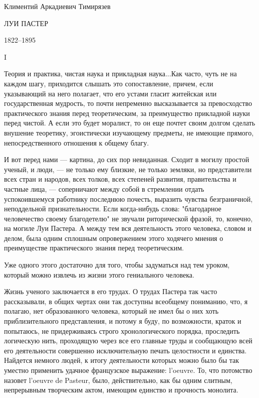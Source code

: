 Климентий Аркадиевич Тимирязев


ЛУИ ПАСТЕР

1822--1895

I

Теория и практика, чистая наука и прикладная наука...Как часто, чуть  не
на каждом  шагу,  приходится  слышать это  сопоставление,  причем,  если
указывающий на  него  полагает,  что его  устами  гласит  житейская  или
государственная  мудрость,   то   почти  непременно   высказывается   за
превосходство практического знания перед теоретическим, за  преимущество
прикладной науки перед  чистой. А  если это  будет моралист,  то он  еще
почтет своим долгом сделать внушение теоретику, эгоистически  изучающему
предметы, не  имеющие  прямого,  непосредственного  отношения  к  общему
благу.

И вот  перед нами  --- картина,  до сих  пор невиданная.  Сходит в  могилу
простой ученый, и люди, --- не  только ему близкие, не только земляки,  но
представители всех стран и народов, всех толков, всех степеней развития,
правительства и частные  лица, ---  соперничают между  собой в  стремлении
отдать успокоившемуся  работнику  последнюю  почесть,  выразить  чувства
безграничной, неподдельной  признательности.  Если  когда-нибудь  слова:
"благодарное человечество  своему благодетелю"  не звучали  риторической
фразой, то, конечно, на могиле Луи Пастера. А между тем вся деятельность
этого человека, словом и делом, была одним сплошным опровержением  этого
ходячего мнения о преимуществе практического знания перед теоретическим.

Уже одного этого достаточно для  того, чтобы задуматься над тем  уроком,
который можно извлечь из жизни этого гениального человека.

Жизнь ученого  заключается в  его  трудах. О  трудах Пастера  так  часто
рассказывали, в общих чертах они так доступны всеобщему пониманию,  что,
я полагаю, нет  образованного человека, который  не имел бы  о них  хоть
приблизительного представления, и потому я буду, по возможности,  краток
и  попытаюсь,   не   придерживаясь  строго   хронологического   порядка,
проследить логическую нить,  проходящую через  все его  главные труды  и
сообщающую  всей  его  деятельности  совершенно  исключительную   печать
целостности и  единства. Найдется  немного людей,  к итогу  деятельности
которых  можно  было  бы  так  уместно  применить  удачное   французское
выражение: l'oeuvre.  То, что  потомство  назовет l'oeuvre  de  Pasteur,
было, действительно, как бы одним слитным, непрерывным творческим актом,
имеющим единство и прочность монолита.


